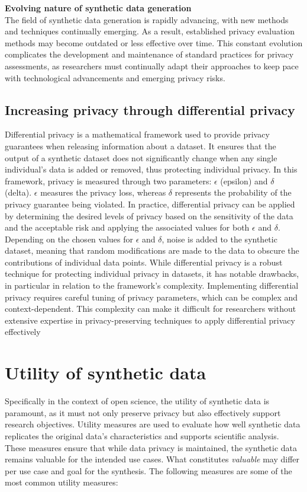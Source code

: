 \textbf{Evolving nature of synthetic data generation} \\
 The field of synthetic data generation is rapidly advancing, with new methods and techniques continually emerging. As a result, established privacy evaluation methods may become outdated or less effective over time. This constant evolution complicates the development and maintenance of standard practices for privacy assessments, as researchers must continually adapt their approaches to keep pace with technological advancements and emerging privacy risks.

 \subsection{Increasing privacy through differential privacy}
 Differential privacy is a mathematical framework used to provide privacy guarantees when releasing information about a dataset. It ensures that the output of a synthetic dataset does not significantly change when any single individual's data is added or removed, thus protecting individual privacy. In this framework, privacy is measured through two parameters: $\epsilon$ (epsilon) and $\delta$ (delta). $\epsilon$ measures the privacy loss, whereas $\delta$ represents the probability of the privacy guarantee being violated. In practice, differential privacy can be applied by determining the desired levels of privacy based on the sensitivity of the data and the acceptable risk and applying the associated values for both $\epsilon$ and $\delta$. Depending on the chosen values for $\epsilon$ and $\delta$, noise is added to the synthetic dataset, meaning that random modifications are made to the data to obscure the contributions of individual data points. While differential privacy is a robust technique for protecting individual privacy in datasets, it has notable drawbacks, in particular in relation to the framework's complexity. Implementing differential privacy requires careful tuning of privacy parameters, which can be complex and context-dependent. This complexity can make it difficult for researchers without extensive expertise in privacy-preserving techniques to apply differential privacy effectively \cite{dwork2006differential}
 

\section{Utility of synthetic data}

Specifically in the context of open science, the utility of synthetic data is paramount, as it must not only preserve privacy but also effectively support research objectives. Utility measures are used to evaluate how well synthetic data replicates the original data's characteristics and supports scientific analysis. These measures ensure that while data privacy is maintained, the synthetic data remains valuable for the intended use cases. What constitutes \textit{valuable} may differ per use case and goal for the synthesis. The following measures are some of the most common utility measures:

